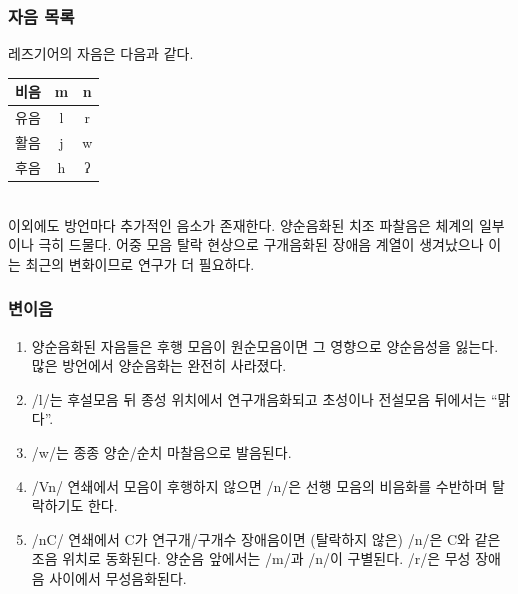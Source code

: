 \subsubsection{자음 목록}
레즈기어의 자음은 다음과 같다.\\
\begin{tabular}{l|cc}
\hline
비음	&m	&n\\
\hline
유음	&l	&r\\
\hline
활음	&j	&w\\
\hline
후음	&h	&ʔ\\
\hline
\end{tabular}\\
이외에도 방언마다 추가적인 음소가 존재한다. 양순음화된 치조 파찰음은 체계의 일부이나 극히 드물다. 어중 모음 탈락 현상으로 구개음화된 장애음 계열이 생겨났으나 이는 최근의 변화이므로 연구가 더 필요하다.
\subsubsection{변이음}
\begin{enumerate}
	\item 양순음화된 자음들은 후행 모음이 원순모음이면 그 영향으로 양순음성을 잃는다. 많은 방언에서 양순음화는 완전히 사라졌다.
	\item /l/는 후설모음 뒤 종성 위치에서 연구개음화되고 초성이나 전설모음 뒤에서는 “맑다”.
	\item /w/는 종종 양순/순치 마찰음으로 발음된다.
	\item /Vn/ 연쇄에서 모음이 후행하지 않으면 /n/은 선행 모음의 비음화를 수반하며 탈락하기도 한다.
	\item /nC/ 연쇄에서 C가 연구개/구개수 장애음이면 (탈락하지 않은) /n/은 C와 같은 조음 위치로 동화된다. 양순음 앞에서는 /m/과 /n/이 구별된다. /r/은 무성 장애음 사이에서 무성음화된다.
\end{enumerate}

